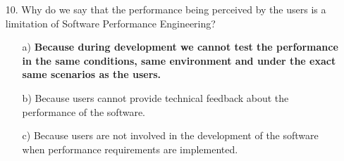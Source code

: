 \documentclass[12pt]{article}
\begin{document}
\begin{itemize}
    \item[10.] Why do we say that the performance being perceived by the users is a limitation of Software Performance Engineering?
    \begin{itemize}
        \item[a)] \textbf{Because during development we cannot test the performance in the same conditions, same environment and under the exact same scenarios as the users.}
        \item[b)] Because users cannot provide technical feedback about the performance of the software.
        \item[c)] Because users are not involved in the development of the software when performance requirements are implemented.
    \end{itemize}

\end{itemize}
\end{document}
